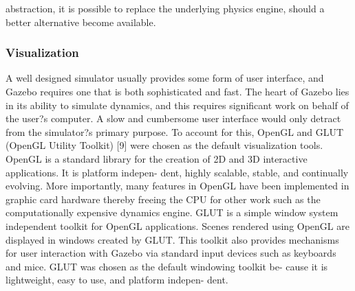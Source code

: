 abstraction, it is possible to replace the underlying physics engine, should a better alternative become available.

\subsubsection{Visualization}

A well designed simulator usually provides some form of user interface, and Gazebo requires one that is both sophisticated and fast. The heart of Gazebo lies in its ability to simulate dynamics, and this requires significant work on behalf of the user?s computer. A slow and cumbersome user interface would only detract from the simulator?s primary purpose. To account for this, OpenGL and GLUT (OpenGL Utility Toolkit) [9] were chosen as the default visualization tools.
OpenGL is a standard library for the creation of 2D and 3D interactive applications. It is platform indepen- dent, highly scalable, stable, and continually evolving. More importantly, many features in OpenGL have been implemented in graphic card hardware thereby freeing the CPU for other work such as the computationally expensive dynamics engine.
GLUT is a simple window system independent toolkit for OpenGL applications. Scenes rendered using OpenGL are displayed in windows created by GLUT. This toolkit also provides mechanisms for user interaction with Gazebo via standard input devices such as keyboards and mice. GLUT was chosen as the default windowing toolkit be- cause it is lightweight, easy to use, and platform indepen- dent.


